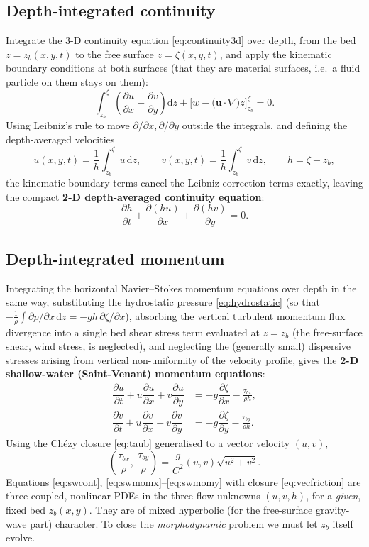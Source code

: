 \documentclass[11pt,a4paper]{report}
\theoremstyle{definition}
\theoremstyle{plain}
\theoremstyle{remark}
\newcommand{\dd}{\mathrm{d}}
\newcommand{\pdv}[2]{\dfrac{\partial #1}{\partial #2}}
\newcommand{\vect}[1]{\boldsymbol{#1}}
\begin{document}
\subsection{Depth-integrated continuity}
Integrate the 3-D continuity equation \eqref{eq:continuity3d} over depth, from the bed $z=z_b(x,y,t)$ to the free surface $z=\zeta(x,y,t)$, and apply the kinematic boundary conditions at both surfaces (that they are material surfaces, i.e.\ a fluid particle on them stays on them):
\begin{equation}
\int_{z_b}^{\zeta}\left(\pdv{u}{x}+\pdv{v}{y}\right)\dd z + \Big[w-\big(\vect{u}\cdot\nabla\big)z\Big]^{\zeta}_{z_b} = 0.
\end{equation}
Using Leibniz's rule to move $\partial/\partial x,\partial/\partial y$ outside the integrals, and defining the depth-averaged velocities
\begin{equation}
u(x,y,t)=\frac{1}{h}\int_{z_b}^{\zeta}u\,\dd z, \qquad v(x,y,t)=\frac{1}{h}\int_{z_b}^{\zeta}v\,\dd z, \qquad h=\zeta-z_b,
\end{equation}
the kinematic boundary terms cancel the Leibniz correction terms exactly, leaving the compact \textbf{2-D depth-averaged continuity equation}:
\begin{equation}
\boxed{\pdv{h}{t} + \pdv{(hu)}{x} + \pdv{(hv)}{y} = 0.}
\label{eq:swcont}
\end{equation}

\subsection{Depth-integrated momentum}
Integrating the horizontal Navier--Stokes momentum equations over depth in the same way, substituting the hydrostatic pressure \eqref{eq:hydrostatic} (so that $-\frac1\rho\int\partial p/\partial x\,\dd z = -gh\,\partial\zeta/\partial x$), absorbing the vertical turbulent momentum flux divergence into a single bed shear stress term evaluated at $z=z_b$ (the free-surface shear, wind stress, is neglected), and neglecting the (generally small) dispersive stresses arising from vertical non-uniformity of the velocity profile, gives the \textbf{2-D shallow-water (Saint-Venant) momentum equations}:
\begin{align}
\pdv{u}{t} + u\pdv{u}{x} + v\pdv{u}{y} &= -g\pdv{\zeta}{x} - \frac{\tau_{bx}}{\rho h}, \label{eq:swmomx}\\[4pt]
\pdv{v}{t} + u\pdv{v}{x} + v\pdv{v}{y} &= -g\pdv{\zeta}{y} - \frac{\tau_{by}}{\rho h}. \label{eq:swmomy}
\end{align}
Using the Chézy closure \eqref{eq:taub} generalised to a vector velocity $(u,v)$,
\begin{equation}
\left(\frac{\tau_{bx}}{\rho},\ \frac{\tau_{by}}{\rho}\right) = \frac{g}{C^2}(u,v)\sqrt{u^2+v^2}.
\label{eq:vecfriction}
\end{equation}
Equations \eqref{eq:swcont}, \eqref{eq:swmomx}--\eqref{eq:swmomy} with closure \eqref{eq:vecfriction} are three coupled, nonlinear PDEs in the three flow unknowns $(u,v,h)$, for a \emph{given}, fixed bed $z_b(x,y)$. They are of mixed hyperbolic (for the free-surface gravity-wave part) character. To close the \emph{morphodynamic} problem we must let $z_b$ itself evolve.
\end{document}
